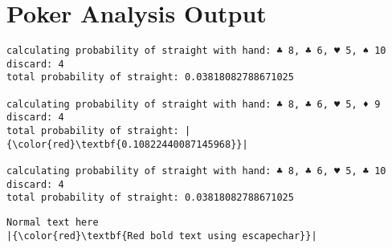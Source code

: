\documentclass{article}
\begin{document}
\section*{Poker Analysis Output}

\begin{lstlisting}[label = strex, caption = Straight Probability Calculation Example]
calculating probability of straight with hand: ♣ 8, ♣ 6, ♥ 5, ♠ 10 
discard: 4
total probability of straight: 0.03818082788671025 

calculating probability of straight with hand: ♣ 8, ♣ 6, ♥ 5, ♦ 9 
discard: 4
total probability of straight: |{\color{red}\textbf{0.10822440087145968}}|

calculating probability of straight with hand: ♣ 8, ♣ 6, ♥ 5, ♣ 10 
discard: 4
total probability of straight: 0.03818082788671025 
\end{lstlisting}

\begin{lstlisting}[label = highlight-demo]
Normal text here
|{\color{red}\textbf{Red bold text using escapechar}}|
\end{lstlisting}
\end{document}
